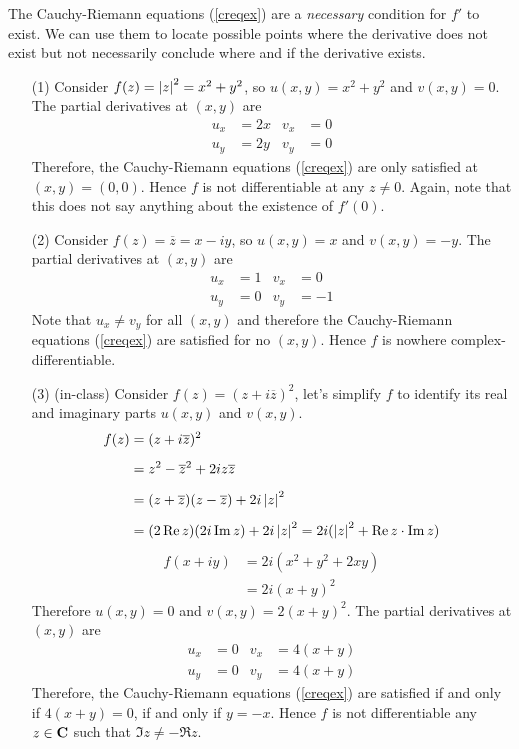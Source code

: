 The Cauchy-Riemann equations (\ref{creqex}) are a \emph{necessary} condition for $f'$ to exist. We can use them to locate possible points where the derivative does not exist but not necessarily conclude where and if the derivative exists.
\begin{example}\label{necessarycr}\hfill
\begin{itemize}
\item[(1)] Consider $f(z) = \left\lvert z\right\rvert^2 = x^2 + y^2$, so $u(x,y) = x^2 + y^2$ and $v(x,y) = 0$. The partial derivatives at $(x,y)$ are
\begin{align*}
u_x &= 2x & v_x &= 0\\[0.5em]
u_y &= 2y & v_y &= 0
\end{align*}
Therefore, the Cauchy-Riemann equations (\ref{creqex}) are only satisfied at $(x,y) = (0,0)$. Hence $f$ is not differentiable at any $z \neq 0$. Again, note that this does not say anything about the existence of $f'(0)$.
\item[(2)] Consider $f(z) = \overline{z} = x - iy$, so $u(x,y) = x$ and $v(x,y) = -y$. The partial derivatives at $(x,y)$ are
\begin{align*}
u_x &= 1 & v_x &= 0\\[0.5em]
u_y &= 0 & v_y &= -1
\end{align*}
Note that $u_x \neq v_y$ for all $(x,y)$ and therefore the Cauchy-Riemann equations (\ref{creqex}) are satisfied for no $(x,y)$. Hence $f$ is nowhere complex-differentiable.
\item[(3)] (in-class) Consider $f(z) = (z + i\overline{z})^2$, let's simplify $f$ to identify its real and imaginary parts $u(x,y)$ and $v(x,y)$.
\begin{align*}
f(z) &= (z + i\overline{z})^2\\[0.5em]
 &= z^2 - \overline{z}^2 + 2iz\overline{z}\\[0.5em]
 &= (z + \overline{z})(z - \overline{z}) + 2i\left\lvert z\right\rvert^2\\[0.5em]
 &= (2\operatorname{Re} z)(2i \operatorname{Im} z) + 2i\left\lvert z\right\rvert^2
 = 2i(\left\lvert z\right\rvert^2 + \operatorname{Re} z \cdot \operatorname{Im} z)
\end{align*}
\begin{align*}
f(x + iy) &= 2i(x^2 + y^2 + 2xy)\\[0.5em]
&= 2i(x + y)^2
\end{align*}
Therefore $u(x,y) = 0$ and $v(x,y) = 2(x + y)^2$. The partial derivatives at $(x,y)$ are
\begin{align*}
u_x &= 0 & v_x &= 4(x + y)\\[0.5em]
u_y &= 0 & v_y &= 4(x + y)
\end{align*}
Therefore, the Cauchy-Riemann equations (\ref{creqex}) are satisfied if and only if $4(x + y) = 0$, if and only if $y = -x$. Hence $f$ is not differentiable any $z \in \mathbf C$ such that $\Im z \neq -\Re z$.
\end{itemize}
\end{example}

